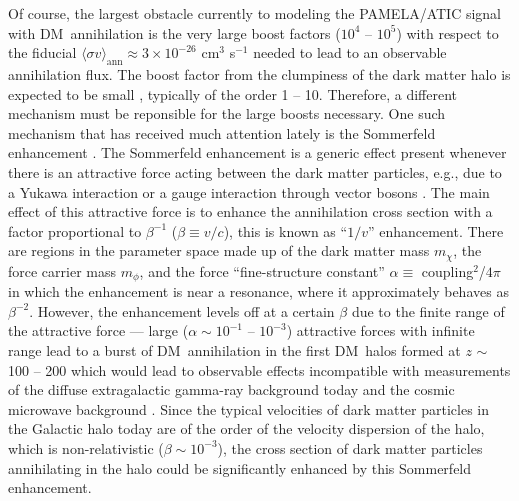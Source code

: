 \documentclass[aps,prd,twocolumn,amsmath,amssymb,floatfix,nofootinbib,10pt]{revtex4}
\newcommand{\eg}{e.g.}
\newcommand{\DM}{DM}
\newcommand{\mdm}{\ensuremath{m_{\chi}}}
\newcommand{\mv}{\ensuremath{m_{\phi}}}
\begin{document}
Of course, the largest obstacle currently to modeling the PAMELA/ATIC
signal with \DM\ annihilation is the very large boost factors ($10^4$
-- $10^5$) with respect to the fiducial $\langle \sigma v
\rangle_{\mathrm{ann}} \approx 3 \times 10^{-26} $ cm$^3$ s$^{-1}$
needed to lead to an observable annihilation flux. The boost factor
from the clumpiness of the dark matter halo is expected to be small
\cite{2008A&A...479..427L,2008Natur.454..735D,2008ApJ...686..262K,2008Natur.456...73S},
typically of the order 1 -- 10. Therefore, a different mechanism must
be reponsible for the large boosts necessary. One such mechanism that
has received much attention lately is the Sommerfeld enhancement
\cite{sommerfeld31a,2003PhRvD..67g5014H,2004PhRvL..92c1303H,2005PhRvD..71f3528H,2005PhRvD..71a5007H,2006PhRvD..73e5004H,2008NuPhB.800..204C,2008JHEP...07..058M,2008arXiv0812.0559M,2008arXiv0812.0360L}. The
Sommerfeld enhancement is a generic effect present whenever there is
an attractive force acting between the dark matter particles, \eg, due
to a Yukawa interaction or a gauge interaction through vector bosons
\cite{ArkaniHamed:2008qn}. The main effect of this attractive force is
to enhance the annihilation cross section with a factor proportional
to $\beta^{-1}$ ($\beta \equiv v/c$), this is known as ``$1/v$''
enhancement. There are regions in the parameter space made up of the
dark matter mass \mdm, the force carrier mass \mv, and the force
``fine-structure constant'' $\alpha \equiv$ coupling$^2$/$4 \pi$ in
which the enhancement is near a resonance, where it approximately
behaves as $\beta^{-2}$. However, the enhancement levels off at a
certain $\beta$ due to the finite range of the attractive force ---
large ($\alpha \sim\!10^{-1}$ -- $10^{-3}$) attractive forces with
infinite range lead to a burst of \DM\ annihilation in the first \DM\
halos formed at $z$ $\sim$ 100 -- 200 which would lead to observable
effects incompatible with measurements of the diffuse extragalactic
gamma-ray background today and the cosmic microwave background
\cite{2008arXiv0810.3233K}. Since the typical velocities of dark
matter particles in the Galactic halo today are of the order of the
velocity dispersion of the halo, which is non-relativistic ($\beta\sim
10^{-3}$), the cross section of dark matter particles annihilating in
the halo could be significantly enhanced by this Sommerfeld enhancement.
\end{document}
